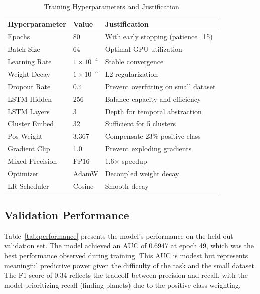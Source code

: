 \documentclass[letterpaper]{article}
\begin{document}
\begin{table}[h]
\centering
\caption{Training Hyperparameters and Justification}
\label{tab:hyperparams}
\begin{tabular}{@{}llp{5.5cm}@{}}
\toprule
\textbf{Hyperparameter} & \textbf{Value} & \textbf{Justification} \\
\midrule
Epochs & 80 & With early stopping (patience=15) \\
Batch Size & 64 & Optimal GPU utilization \\
Learning Rate & $1 \times 10^{-4}$ & Stable convergence \\
Weight Decay & $1 \times 10^{-5}$ & L2 regularization \\
Dropout Rate & 0.4 & Prevent overfitting on small dataset \\
LSTM Hidden & 256 & Balance capacity and efficiency \\
LSTM Layers & 3 & Depth for temporal abstraction \\
Cluster Embed & 32 & Sufficient for 5 clusters \\
Pos Weight & 3.367 & Compensate 23\% positive class \\
Gradient Clip & 1.0 & Prevent exploding gradients \\
Mixed Precision & FP16 & 1.6$\times$ speedup \\
Optimizer & AdamW & Decoupled weight decay \\
LR Scheduler & Cosine & Smooth decay \\
\bottomrule
\end{tabular}
\end{table}

\subsection{Validation Performance}

Table~\ref{tab:performance} presents the model's performance on the held-out validation set. The model achieved an AUC of 0.6947 at epoch 49, which was the best performance observed during training. This AUC is modest but represents meaningful predictive power given the difficulty of the task and the small dataset. The F1 score of 0.34 reflects the tradeoff between precision and recall, with the model prioritizing recall (finding planets) due to the positive class weighting.
\end{document}
